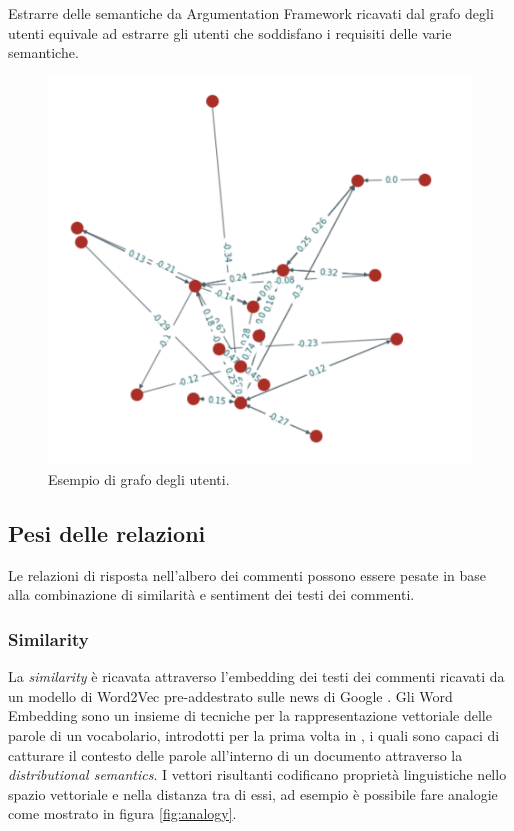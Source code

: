 Estrarre delle semantiche da Argumentation Framework ricavati dal grafo degli utenti equivale ad estrarre gli utenti che soddisfano i requisiti delle varie semantiche.


\begin{figure}[h]
    \includegraphics[width=\linewidth]{Immagini/users-graph.png}
    \caption{Esempio di grafo degli utenti.}
    \label{fig:users-graph}
\end{figure}

\subsection{Pesi delle relazioni}
\label{subsection:weight}
Le relazioni di risposta nell'albero dei commenti possono essere pesate in base alla combinazione di similarità e sentiment dei testi dei commenti.

\subsubsection{Similarity}
La \textit{similarity} è ricavata attraverso l'embedding dei testi dei commenti ricavati da un modello di Word2Vec pre-addestrato sulle news di Google \cite{googlenewsmodel}. Gli Word Embedding sono un insieme di tecniche per la rappresentazione vettoriale delle parole di un vocabolario, introdotti per la prima volta in \cite{mikolov2013distributed}, i quali sono capaci di catturare il contesto delle parole all'interno di un documento attraverso la \textit{distributional semantics}. I vettori risultanti codificano proprietà linguistiche nello spazio vettoriale e nella distanza tra di essi, ad esempio è possibile fare analogie come mostrato in figura \ref{fig:analogy}.

